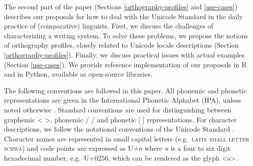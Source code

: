 The second part of the paper (Sections \ref{orthography-profiles} and \ref{use-cases}) describes our proposals for how to deal with the Unicode Standard in the daily practice of (comparative) linguists. First, we discuss the challenges of characterizing a writing system. To solve these problems, we propose the notions of orthography profiles, closely related to Unicode locale descriptions (Section \ref{orthography-profiles}). Finally, we discuss practical issues with actual examples (Section \ref{use-cases}). We provide reference implementation of our proposals in R and in Python, available as open-source libraries.

The following conventions are followed in this paper. All phonemic and phonetic representations are given in the International Phonetic Alphabet (IPA), unless noted otherwise \citep{IPA2005}. Standard conventions are used for distinguishing between graphemic < >, phonemic / / and phonetic [ ] representations. For character descriptions, we follow the notational conventions of the Unicode Standard \citep{Unicode2014}. Character names are represented in small capital letters (e.g.~\textsc{latin small letter schwa}) and code points are expressed as U\emph{+n} where \emph{n} is a four to six digit hexadecimal number, e.g.~U+0256, which can be rendered as the glyph <ə>.